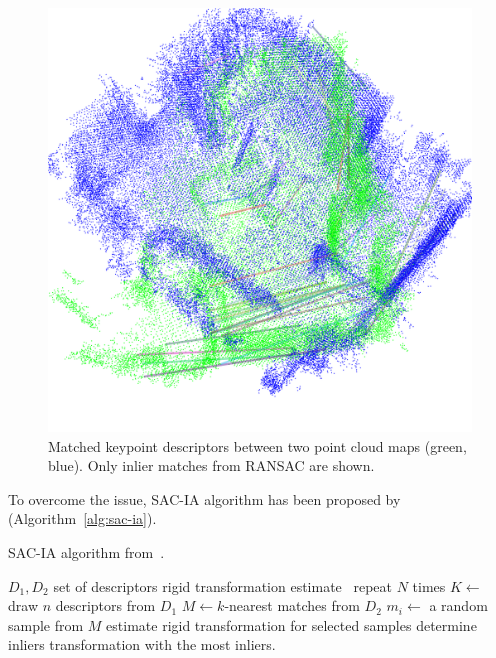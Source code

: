 \begin{figure}
    \centering
    \includegraphics[width=\textwidth]{../img/v1-matching.png}
    \caption[Keypoint matches]{Matched keypoint descriptors between two point cloud maps (green, blue). Only inlier matches from \gls{RANSAC} are shown.}
    \label{fig:v1-matching}
\end{figure}

To overcome the issue, \gls{SAC-IA} algorithm has been proposed by~\citet{rusu2009fpfh} (Algorithm~\ref{alg:sac-ia}).

\begin{algorithm}
    \caption[\gls{SAC-IA}]{\gls{SAC-IA} algorithm from~\citet{rusu2009fpfh}.}
    \label{alg:sac-ia}
    \begin{algorithmic}[1]
        \Require $D_1, D_2$ set of descriptors
        \Ensure rigid transformation estimate
            \Loop~repeat $N$ times
                \State $K \gets$ draw $n$ descriptors from $D_1$
                    \State $M \gets k$-nearest matches from $D_2$
                    \State $m_i \gets$ a random sample from $M$
                \EndFor
                \State estimate rigid transformation for selected samples
                \State determine inliers
            \EndLoop
            \State \Return transformation with the most inliers.
        \EndFunction
    \end{algorithmic}
\end{algorithm}

